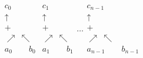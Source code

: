 \begin{gather*}
\begin{array}{c}
c_0\\
\uparrow\\
+\\
\nearrow\ \nwarrow\\
a_0\qquad b_0
\end{array}
\begin{array}{c}
c_1\\
\uparrow\\
+\\
\nearrow\ \nwarrow\\
a_1\qquad b_1
\end{array}
\hdots
\begin{array}{c}
c_{n-1}\\
\uparrow\\
+\\
\nearrow\ \nwarrow\\
a_{n-1}\qquad b_{n-1}
\end{array}
\end{gather*}